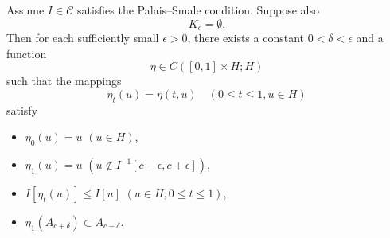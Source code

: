\begin{theorem}
\label{thm:deformation-theorem}
Assume $I \in \mathcal{C}$ satisfies the Palais--Smale condition. Suppose also
\[
K_c = \emptyset.
\tag{3}
\]
Then for each sufficiently small $\epsilon > 0$, there exists a constant $0 < \delta < \epsilon$ and a function
\[
\eta \in C([0,1] \times H; H)
\]
such that the mappings
\[
\eta_t(u) = \eta(t, u) \quad (0 \le t \le 1, u \in H)
\]
satisfy
\begin{itemize}
\item[(i)] $\eta_0(u) = u$ \quad $(u \in H)$,
\item[(ii)] $\eta_1(u) = u$ \quad $(u \notin I^{-1}[c - \epsilon, c + \epsilon])$,
\item[(iii)] $I[\eta_t(u)] \le I[u]$ \quad $(u \in H, 0 \le t \le 1)$,
\item[(iv)] $\eta_1(A_{c+\delta}) \subset A_{c-\delta}$.
\end{itemize}
\end{theorem}
